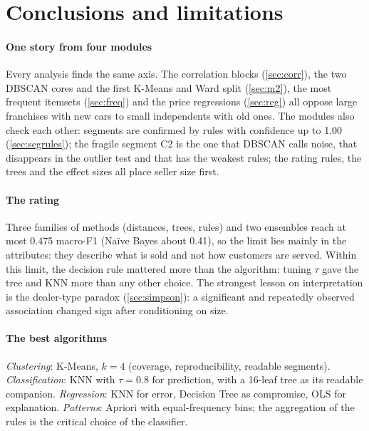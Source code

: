 \section{Conclusions and limitations}\label{sec:concl}
\paragraph{One story from four modules} Every analysis finds the same axis. The correlation blocks (\cref{sec:corr}), the two DBSCAN cores and the first K-Means and Ward split (\cref{sec:m2}), the most frequent itemsets (\cref{sec:freq}) and the price regressions (\cref{sec:reg}) all oppose large franchises with new cars to small independents with old ones. The modules also check each other: segments are confirmed by rules with confidence up to 1.00 (\cref{sec:segrules}); the fragile segment C2 is the one that DBSCAN calls noise, that disappears in the outlier test and that has the weakest rules; the rating rules, the trees and the effect sizes all place seller size first.

\paragraph{The rating} Three families of methods (distances, trees, rules) and two ensembles reach at most 0.475 macro-F1 (Na\"ive Bayes about 0.41), so the limit lies mainly in the attributes: they describe what is sold and not how customers are served. Within this limit, the decision rule mattered more than the algorithm: tuning $\tau$ gave the tree and KNN more than any other choice. The strongest lesson on interpretation is the dealer-type paradox (\cref{sec:simpson}): a significant and repeatedly observed association changed sign after conditioning on size.

\paragraph{The best algorithms} \emph{Clustering}: K-Means, $k=4$ (coverage, reproducibility, readable segments). \emph{Classification}: KNN with $\tau=0.8$ for prediction, with a 16-leaf tree as its readable companion. \emph{Regression}: KNN for error, Decision Tree as compromise, OLS for explanation. \emph{Patterns}: Apriori with equal-frequency bins; the aggregation of the rules is the critical choice of the classifier.

